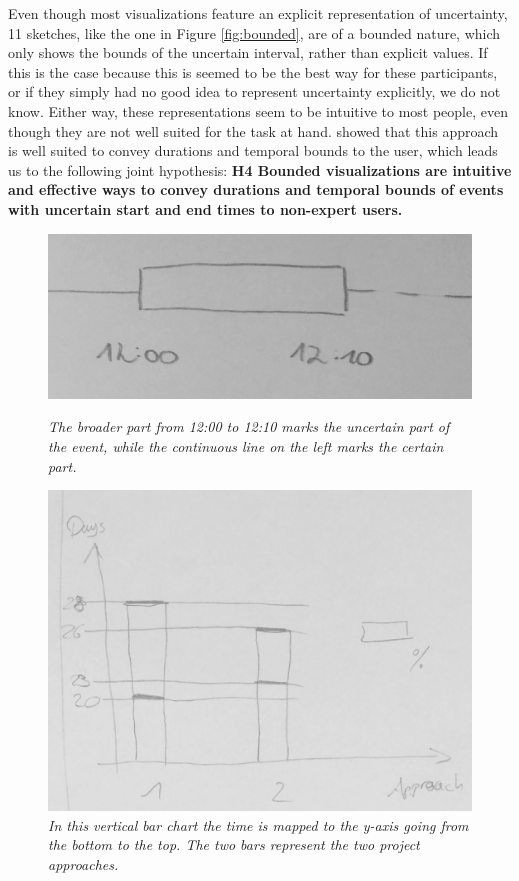 Even though most visualizations feature an explicit representation of uncertainty, 11 sketches, like the one in Figure \ref{fig:bounded}, are of a bounded nature, which only shows the bounds of the uncertain interval, rather than explicit values. If this is the case because this is seemed to be the best way for these participants, or if they simply had no good idea to represent uncertainty explicitly, we do not know. Either way, these representations seem to be intuitive to most people, even though they are not well suited for the task at hand. \citet{gschwandtner2016visual} showed that this approach is well suited to convey durations and temporal bounds to the user, which leads us to the following joint hypothesis: \textbf{H4 Bounded visualizations are intuitive and effective ways to convey durations and temporal bounds of events with uncertain start and end times to non-expert users.}\par \medskip

\begin{figure}[H]
	\begin{minipage}{.5\textwidth}
		\centering
		\captionsetup{width=0.8\textwidth}
		\includegraphics[height=0.35\textwidth]{figures/bounded.jpg}
		\caption{\textit{The broader part from 12:00 to 12:10 marks the uncertain part of the event, while the continuous line on the left marks the certain part.}}
		\label{fig:bounded}
	\end{minipage}
	\begin{minipage}{.5\textwidth}
		\centering
		\captionsetup{width=1.0\textwidth}
		\includegraphics[height=0.6\textwidth]{figures/timeBotTop.jpg}
		\caption{\textit{In this vertical bar chart the time is mapped to the y-axis going from the bottom to the top. The two bars represent the two project approaches.}}
		\label{fig:timeBotTop}
	\end{minipage}
\end{figure}

